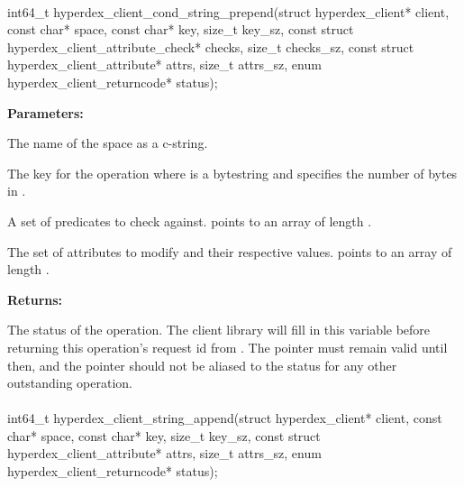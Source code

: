 \paragraph{}
\label{api:c:cond_string_prepend}
\begin{ccode}
int64_t hyperdex_client_cond_string_prepend(struct hyperdex_client* client,
                const char* space,
                const char* key, size_t key_sz,
                const struct hyperdex_client_attribute_check* checks, size_t checks_sz,
                const struct hyperdex_client_attribute* attrs, size_t attrs_sz,
                enum hyperdex_client_returncode* status);
\end{ccode}
\funcdesc 

\noindent\textbf{Parameters:}
\begin{description}[labelindent=\widthof{{\code{checks}, \code{checks\_sz}}},leftmargin=*,noitemsep,nolistsep,align=right]
\item[\code{space}] The name of the space as a c-string.
\item[\code{key}, \code{key\_sz}] The key for the operation where  is a bytestring and  specifies the number of bytes in .
\item[\code{checks}, \code{checks\_sz}] A set of predicates to check against.   points to an array of length .
\item[\code{attrs}, \code{attrs\_sz}] The set of attributes to modify and their respective values.   points to an array of length .
\end{description}

\noindent\textbf{Returns:}
\begin{description}[labelindent=\widthof{{\code{status}}},leftmargin=*,noitemsep,nolistsep,align=right]
\item[\code{status}] The status of the operation.  The client library will fill in this variable before returning this operation's request id from .  The pointer must remain valid until then, and the pointer should not be aliased to the status for any other outstanding operation.
\end{description}

\paragraph{}
\label{api:c:string_append}
\begin{ccode}
int64_t hyperdex_client_string_append(struct hyperdex_client* client,
                const char* space,
                const char* key, size_t key_sz,
                const struct hyperdex_client_attribute* attrs, size_t attrs_sz,
                enum hyperdex_client_returncode* status);
\end{ccode}
\funcdesc 

